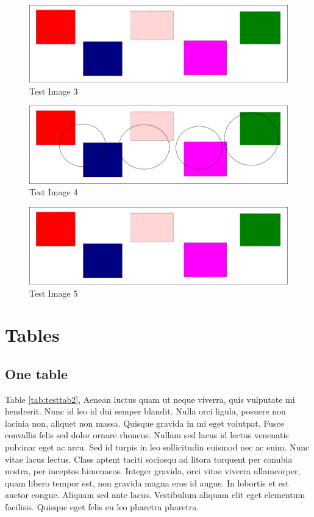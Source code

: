\begin{figure}[p]
    \centering
    \includegraphics[width=\textwidth]{figures/test_image}
    \caption{Test Image 3}
    \label{fig:test_image3}
\end{figure}

\begin{figure}[p]
    \centering
    \includegraphics[width=\textwidth]{figures/test_image2}
    \caption{Test Image 4}
    \label{fig:test_image4}
\end{figure}

\begin{figure}[p]
    \centering
    \includegraphics[width=\textwidth]{figures/test_image}
    \caption{Test Image 5}
    \label{fig:test_image5}
\end{figure}

\section{Tables}
\subsection{One table}
Table \ref{tab:testtab2}, Aenean luctus quam ut neque viverra, quis vulputate
mi hendrerit. Nunc id leo id dui semper blandit. Nulla orci ligula, posuere non
lacinia non, aliquet non massa. Quisque gravida in mi eget volutpat. Fusce
convallis felis sed dolor ornare rhoncus. Nullam sed lacus id lectus venenatis
pulvinar eget ac arcu. Sed id turpis in leo sollicitudin euismod nec ac enim.
Nunc vitae lacus lectus.  Class aptent taciti sociosqu ad litora torquent per
conubia nostra, per inceptos himenaeos. Integer gravida, orci vitae viverra
ullamcorper, quam libero tempor est, non gravida magna eros id augue. In
lobortis et est auctor congue. Aliquam sed ante lacus. Vestibulum aliquam elit
eget elementum facilisis. Quisque eget felis eu leo pharetra pharetra.


